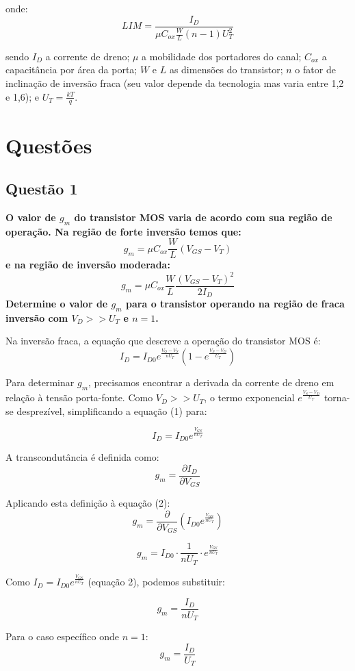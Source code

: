 \documentclass[12pt,a4paper]{article}
\begin{document}
onde:
$$LIM = \frac{I_D}{\mu C_{ox} \frac{W}{L} (n-1) U_T^2}$$

sendo $I_D$ a corrente de dreno; $\mu$ a mobilidade dos portadores do canal; $C_{ox}$ a capacitância por área da porta; $W$ e $L$ as dimensões do transistor; $n$ o fator de inclinação de inversão fraca (seu valor depende da tecnologia mas varia entre 1,2 e 1,6); e $U_T = \frac{kT}{q}$.

\newpage

\section*{Questões}

\subsection*{Questão 1}

\textbf{O valor de $g_m$ do transistor MOS varia de acordo com sua região de operação. Na região de forte inversão temos que:
$$g_m = \mu C_{ox} \frac{W}{L} (V_{GS} - V_T)$$
e na região de inversão moderada:
$$g_m = \mu C_{ox} \frac{W}{L} \frac{(V_{GS} - V_T)^2}{2I_D}$$
Determine o valor de $g_m$ para o transistor operando na região de fraca inversão com $V_D >> U_T$ e $n = 1$.}

Na inversão fraca, a equação que descreve a operação do transistor MOS é:
$$I_D = I_{D0} e^{\frac{V_G - V_S}{nU_T}} \left(1 - e^{\frac{V_S - V_D}{U_T}}\right) $$

Para determinar $g_m$, precisamos encontrar a derivada da corrente de dreno em relação à tensão porta-fonte. Como $V_D >> U_T$, o termo exponencial $e^{\frac{V_S - V_D}{U_T}}$ torna-se desprezível, simplificando a equação (1) para:

$$I_D = I_{D0} e^{\frac{V_{GS}}{nU_T}} $$

A transcondutância é definida como:
$$g_m = \frac{\partial I_D}{\partial V_{GS}}$$

Aplicando esta definição à equação (2):
$$g_m = \frac{\partial}{\partial V_{GS}} \left( I_{D0} e^{\frac{V_{GS}}{nU_T}} \right)$$

$$g_m = I_{D0} \cdot \frac{1}{nU_T} \cdot e^{\frac{V_{GS}}{nU_T}}$$

Como $I_D = I_{D0} e^{\frac{V_{GS}}{nU_T}}$ (equação 2), podemos substituir:

$$g_m = \frac{I_D}{nU_T} $$

Para o caso específico onde $n = 1$:
$$g_m = \frac{I_D}{U_T} $$
\end{document}
